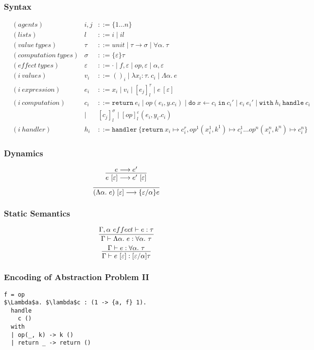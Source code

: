 \documentclass{article}
\theoremstyle{definition}
\begin{document}
\subsubsection{Syntax}
\begin{align*}
&(agents) &i, j &::= \{1 \dots n\}\\
&(lists) & l &::= i \mid il\\
&(value\ types) &\tau &::= unit \mid \tau \rightarrow \sigma \mid \forall \alpha.\ \tau\\
&(computation\ types) &\sigma &::= \{\varepsilon\}\tau\\
&(effect\ types) &\varepsilon &::= \cdot \mid f, \varepsilon \mid op, \varepsilon \mid \alpha, \varepsilon\\
&(i\  values) &{v_i} &::= ()_i \mid \lambda x_i:\tau.\ c_i \mid \Lambda \alpha.\ e\\
&(i\ expression) &e_i &::= x_i \mid v_i \mid [e_j]^\tau_l \mid e\ [\varepsilon]\\
&(i\ computation) &c_i &::= \texttt{return}\ e_i \mid op(e_i, y.c_i) \mid \texttt{do}\ x \leftarrow c_i\ \texttt{in}\ c_i' \mid e_i\ e_i' \mid \texttt{with}\ h_i\ \texttt{handle}\ c_i\\
 &\ &\mid\ &[c_j]^\sigma_l \mid [op]^\varepsilon_l (e_i, y_i.c_i)\\
&(i\ handler) &h_i &::= \texttt{handler}\ \{\texttt{return}\ x_i \mapsto c^r_i, op^1(x_i^1, k^1) \mapsto c_i^1 \dots  op^n(x_i^n, k^n) \mapsto c_i^n\}  
\end{align*}

\subsubsection{Dynamics}
$$\infer{e\ [\varepsilon] \longrightarrow e'\ [\varepsilon]}{e \longrightarrow e'}$$ \quad
$$\infer{(\Lambda \alpha.\ e)\ [\varepsilon] \longrightarrow \{\varepsilon/\alpha\} e}{}$$

\subsubsection{Static Semantics}
$$\infer{\Gamma \vdash \Lambda \alpha.\ e : \forall \alpha.\ \tau}{\Gamma, \alpha\ effect \vdash e: \tau}$$ \quad
$$\infer{\Gamma \vdash e\ [\varepsilon] :  [\varepsilon / \alpha] \tau}{\Gamma \vdash e: \forall \alpha.\ \tau}$$ 

\subsubsection{Encoding of Abstraction Problem II}
\begin{lstlisting}
f = op
$\Lambda$a. $\lambda$c : (1 -> {a, f} 1).
  handle 
    c ()
  with
  | op(_, k) -> k ()
  | return _ -> return ()
\end{lstlisting}
\end{document}
